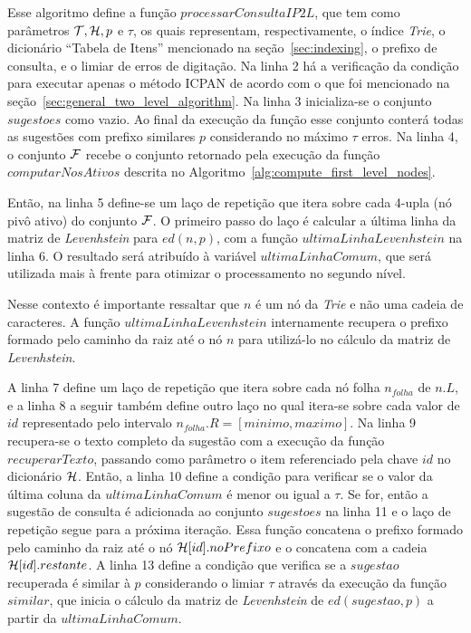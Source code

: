 Esse algoritmo define a função $processarConsultaIP2L$, que tem como parâmetros $\mathcal{T}, \mathcal{H}, p$ e $\tau$, os quais representam, respectivamente, o índice \textit{Trie}, o dicionário ``Tabela de Itens'' mencionado na seção~\ref{sec:indexing}, o prefixo de consulta, e o limiar de erros de digitação. Na linha 2 há a verificação da condição para executar apenas o método ICPAN de acordo com o que foi mencionado na seção~\ref{sec:general_two_level_algorithm}. Na linha 3 inicializa-se o conjunto $sugestoes$ como vazio. Ao final da execução da função esse conjunto conterá todas as sugestões com prefixo similares $p$ considerando no máximo $\tau$ erros. Na linha 4, o conjunto $\mathcal{F}$ recebe o conjunto retornado pela execução da função $computarNosAtivos$ descrita no Algoritmo~\ref{alg:compute_first_level_nodes}. 

Então, na linha 5 define-se um laço de repetição que itera sobre cada 4-upla (nó pivô ativo) do conjunto $\mathcal{F}$. O primeiro passo do laço é calcular a última linha da matriz de \textit{Levenhstein} para $ed(n, p)$, com a função $ultimaLinhaLevenhstein$ na linha 6. O resultado será atribuído à variável $ultimaLinhaComum$, que será utilizada mais à frente para otimizar o processamento no segundo nível. 

Nesse contexto é importante ressaltar que $n$ é um nó da \textit{Trie} e não uma cadeia de caracteres. A função $ultimaLinhaLevenhstein$ internamente recupera o prefixo formado pelo caminho da raiz até o nó $n$ para utilizá-lo no cálculo da matriz de \textit{Levenhstein}. 

A linha 7 define um laço de repetição que itera sobre cada nó folha $n_{folha}$ de $n.L$, e a linha 8 a seguir também define outro laço no qual itera-se sobre cada valor de $id$ representado pelo intervalo $n_{folha}.R = [minimo, maximo]$. Na linha 9 recupera-se o texto completo da sugestão com a execução da função $recuperarTexto$, passando como parâmetro o item referenciado pela chave $id$ no dicionário $\mathcal{H}$. Então, a linha 10 define a condição para verificar se o valor da última coluna da $ultimaLinhaComum$ é menor ou igual a $\tau$. Se for, então a sugestão de consulta é adicionada ao conjunto $sugestoes$ na linha 11 e o laço de repetição segue para a próxima iteração. Essa função concatena o prefixo formado pelo caminho da raiz até o nó $\mathcal{H}[id].noPrefixo$ e o concatena com a cadeia $\mathcal{H}[id].restante$. A linha 13 define a condição que verifica se a $sugestao$ recuperada é similar à $p$ considerando o limiar $\tau$ através da execução da função $similar$, que inicia o cálculo da matriz de \textit{Levenhstein} de $ed(sugestao, p)$ a partir da $ultimaLinhaComum$. 

